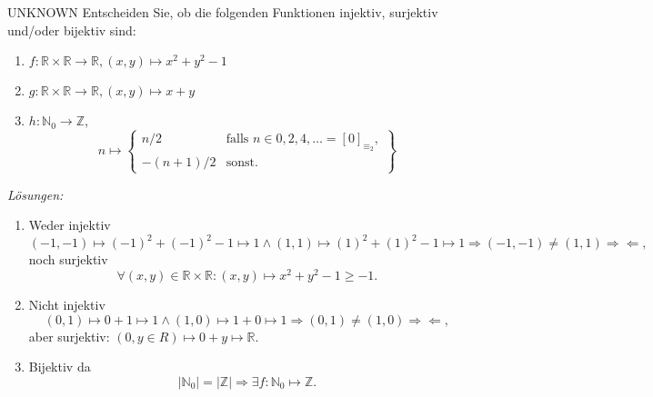 \documentclass{problemset}
\begin{document}
\begin{problem}{UNKNOWN}
Entscheiden Sie, ob die folgenden Funktionen injektiv, surjektiv und/oder bijektiv sind:
\begin{enumerate}[label=\roman*)]
    \item $f: \mathbb{R} \times \mathbb{R} \rightarrow \mathbb{R}, (x,y) \mapsto x^2 + y^2 -1$
    \item $g: \mathbb{R} \times \mathbb{R} \rightarrow \mathbb{R}, (x,y) \mapsto x + y$
    \item $h: \mathbb{N}_0 \rightarrow \mathbb{Z}$, \[
              n \mapsto \left\{
              \begin{array}{ll}
                  n/2      & \text{falls } n \in {0,2,4, \dots} = [0]_{\equiv_2}, \\
                  -(n+1)/2 & \text{sonst}.
              \end{array}
              \right\}
          \]
\end{enumerate}
\textit{Lösungen:}
\begin{enumerate}[label=\roman*)]
    \item Weder injektiv
          \[
              (-1,-1) \mapsto {(-1)}^2 + {(-1)}^2 - 1 \mapsto 1
              \land
              (1,1) \mapsto {(1)}^2 + {(1)}^2 - 1 \mapsto 1
              \Rightarrow
              (-1,-1) \not = (1,1)
              \Rightarrow\Leftarrow,
          \] noch surjektiv \[
              \forall (x,y) \in \mathbb{R} \times \mathbb{R}: (x,y) \mapsto x^2 + y^2 -1 \ge -1.
          \]
    \item Nicht injektiv
          \[
              (0,1) \mapsto 0 + 1 \mapsto 1
              \land
              (1,0) \mapsto 1 + 0 \mapsto 1
              \Rightarrow
              (0,1) \not = (1,0)
              \Rightarrow\Leftarrow,
          \] aber surjektiv: $(0, y \in R) \mapsto 0 + y \mapsto \mathbb{R}$.
    \item Bijektiv da
          \[
              \lvert \mathbb{N}_0 \lvert = \lvert \mathbb{Z} \lvert \Rightarrow \exists f: \mathbb{N}_0 \mapsto \mathbb{Z}.
          \]
\end{enumerate}
\end{problem}
\end{document}
